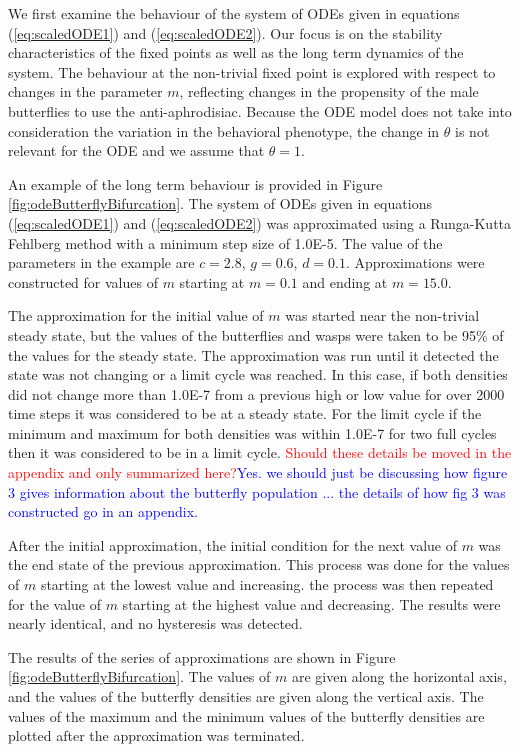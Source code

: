 \documentclass[review,authoryear]{elsarticle}
\begin{document}
We first examine the behaviour of the system of ODEs given in
equations (\ref{eq:scaledODE1}) and (\ref{eq:scaledODE2}). Our focus
is on the stability characteristics of the fixed points as well as the
long term dynamics of the system. The behaviour at the non-trivial
fixed point is explored with respect to changes in the parameter
$m$, reflecting changes in the propensity of the male butterflies to use the anti-aphrodisiac. Because the ODE model does not take into consideration the variation in the behavioral phenotype, the change in $\theta$ is not relevant for the ODE and we 
assume that $\theta=1$.

An example of the long term behaviour is provided in Figure
\ref{fig:odeButterflyBifurcation}. The system of ODEs given in
equations (\ref{eq:scaledODE1}) and (\ref{eq:scaledODE2}) was
approximated using a Runga-Kutta Fehlberg method with a minimum step
size of 1.0E-5.  The value of the parameters in the example are
$c=2.8$, $g=0.6$, $d=0.1$. Approximations were constructed for values
of $m$ starting at $m=0.1$ and ending at $m=15.0$.

The approximation for the initial value of $m$ was started near the
non-trivial steady state, but the values of the butterflies and wasps
were taken to be 95\% of the values for the steady state. The
approximation was run until it detected the state was not changing or
a limit cycle was reached. In this case, if both densities did not
change more than 1.0E-7 from a previous high or low value for over
2000 time steps it was considered to be at a steady state. For the
limit cycle if the minimum and maximum for both densities was within
1.0E-7 for two full cycles then it was considered to be in a limit
cycle. \textcolor{red}{Should these details be moved in the appendix and only summarized here?}\textcolor{blue}{Yes.  we should just be discussing how figure 3 gives information about the butterfly population ... the details of how fig 3 was constructed go in an appendix.}

After the initial approximation, the initial condition for the next
value of $m$ was the end state of the previous approximation. This
process was done for the values of $m$ starting at the lowest value
and increasing. the process was then repeated for the value of $m$
starting at the highest value and decreasing. The results were nearly
identical, and no hysteresis was detected.

The results of the series of approximations are shown in Figure
\ref{fig:odeButterflyBifurcation}. The values of $m$ are given along
the horizontal axis, and the values of the butterfly densities are
given along the vertical axis. The values of the maximum and the
minimum values of the butterfly densities are plotted after the
approximation was terminated.
\end{document}
